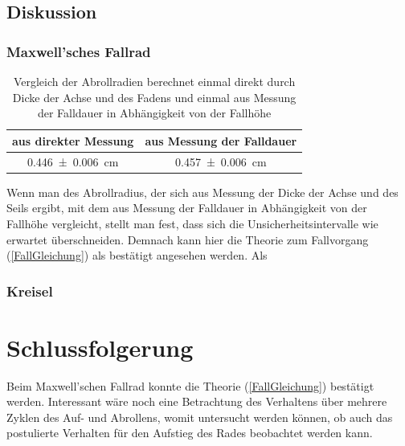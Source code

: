 \documentclass[
	a4paper,
	12pt,
	pagesize,
	ngerman
]{scrartcl}
\begin{document}
	\subsection{Diskussion}
	\subsubsection{Maxwell'sches Fallrad}
	
	\begin{table}[tb]
		\centering
		\begin{tabular}{ c | c }
			aus direkter Messung & aus Messung der Falldauer\\ \hline
			\SI{0,446 \pm 0,006}{cm} & \SI{0,457 \pm 0,006}{cm} \\
		\end{tabular}
		\caption{Vergleich der Abrollradien berechnet einmal direkt durch Dicke der Achse und des Fadens und einmal aus Messung der Falldauer in Abhängigkeit von der Fallhöhe}
		\label{Abrollradius_Vergleich} 
	\end{table}
	Wenn man des Abrollradius, der sich aus Messung der Dicke der Achse und des Seils ergibt, mit dem aus Messung der Falldauer in Abhängigkeit von der Fallhöhe vergleicht, stellt man fest, dass sich die Unsicherheitsintervalle wie erwartet überschneiden.
	Demnach kann hier die Theorie zum Fallvorgang (\cref{FallGleichung}) als bestätigt angesehen werden.
	Als 
	
	\subsubsection{Kreisel}
	
	\section{Schlussfolgerung}
	Beim Maxwell'schen Fallrad konnte die Theorie (\cref{FallGleichung}) bestätigt werden. Interessant wäre noch eine Betrachtung des Verhaltens über mehrere Zyklen des Auf- und Abrollens, womit untersucht werden können, ob auch das postulierte Verhalten für den Aufstieg des Rades beobachtet werden kann. %
	
\end{document}
